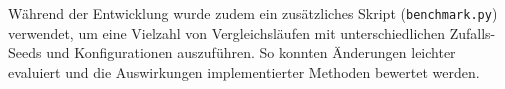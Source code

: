 Während der Entwicklung wurde zudem ein zusätzliches Skript (\texttt{benchmark.py}) verwendet, um eine Vielzahl von Vergleichsläufen mit unterschiedlichen Zufalls-Seeds und Konfigurationen auszuführen. So konnten Änderungen leichter evaluiert und die Auswirkungen implementierter Methoden bewertet werden.